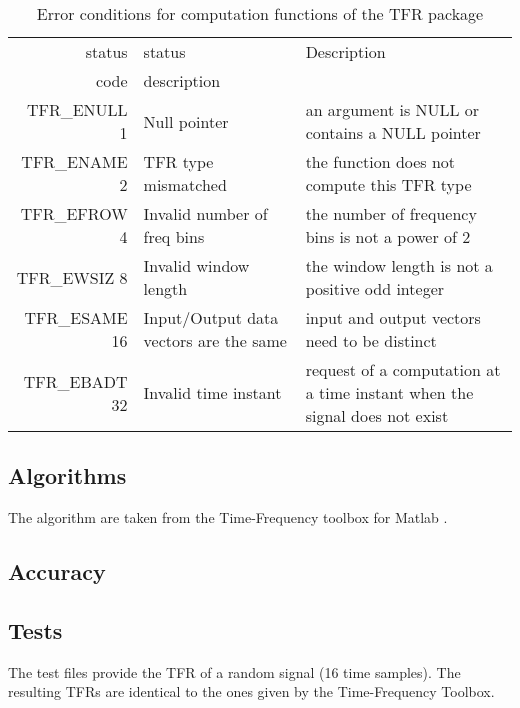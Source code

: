 \documentclass{article}
\begin{document}
\begin{table}
\begin{tabular}{|r|l|p{2in}|}
\hline
status  & status          & Description\\
code    & description     & \\
\hline
TFR\_ENULL 1 & Null pointer
& an argument is NULL or contains a NULL pointer\\
TFR\_ENAME 2 & TFR type mismatched
& the function does not compute this TFR type\\
TFR\_EFROW 4 & Invalid number of freq bins
& the number of frequency bins is not a power of 2\\
TFR\_EWSIZ 8 & Invalid window length
& the window length is not a positive odd integer\\
TFR\_ESAME 16 & Input/Output data vectors are the same
& input and output vectors need to be distinct\\
TFR\_EBADT 32 & Invalid time instant
& request of a computation at a time instant
when the signal does not exist\\
\hline
\end{tabular}
\caption{\label{tfr_tablec} Error conditions for computation
functions of the TFR package}
\end{table}

\subsection{Algorithms}
The algorithm are taken from the Time-Frequency toolbox for Matlab
\cite{tftb}.

\subsection{Accuracy}

\subsection{Tests}
The test files provide the TFR of a random signal (16 time samples).
The resulting TFRs are identical to the ones given by the Time-Frequency Toolbox.
\end{document}
